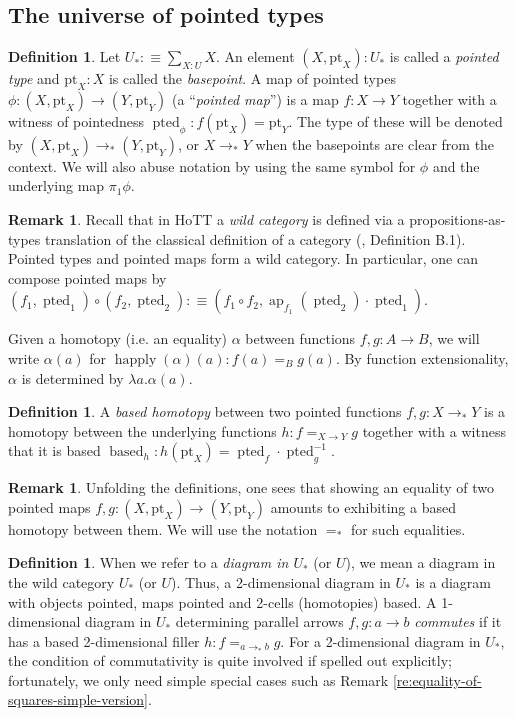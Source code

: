 \documentclass{amsart}
\theoremstyle{definition}
\newtheorem{de}[theorem]{Definition}
\newtheorem{re}[theorem]{Remark}
\newcommand{\ap}{\operatorname{ap}}
\newcommand{\tot}[2]{\sum\limits_{#1}^{}{#2}}
\newcommand{\bs}[1]{\mathrm{pt}_{#1}}
\newcommand{\ptd}[1]{\operatorname{pted}_{#1}}
\newcommand{\pto}{\to_*}
\newcommand{\bsd}[1]{\operatorname{based}_{#1}}
\begin{document}
\subsection{The universe of pointed types}
\begin{de}
    Let $U_* :\equiv \tot{X:U}{X}$. An element $(X, \bs{X}) : U_*$ is called a \textit{pointed type} and $\bs{X} : X$ is called the \textit{basepoint}. A map of pointed types $\phi: (X, \bs{X}) \to (Y, \bs{Y})$  (a ``\textit{pointed map}'') is a map $f: X \to Y$ together with a witness of pointedness $\ptd{\phi}: f(\bs{X}) = \bs{Y}$. The type of these will be denoted by $(X, \bs{X}) \pto (Y, \bs{Y})$, or $X \pto Y$ when the basepoints are clear from the context.
    We will also abuse notation by using the same symbol for $\phi$ and the underlying map $\pi_1 \phi$.
\end{de}

\begin{re}
    Recall that in HoTT a \textit{wild category} is defined via a propositions-as-types translation of the classical definition of a category (\cite{SphereSyms}, Definition B.1). Pointed types and pointed maps form a wild category. In particular, one can compose pointed maps by $(f_1, \ptd{1}) \circ (f_2, \ptd{2}) : \equiv (f_1 \circ f_2, \ap_{f_1}(\ptd{2}) \cdot \ptd{1})$.
\end{re}

Given a homotopy (i.e. an equality) $\alpha$ between functions $f,g: A \to B$, we will write $\alpha(a)$ for $\operatorname{happly}(\alpha)(a): f(a) =_B g(a)$. By function extensionality, $\alpha$ is determined by $\lambda {a}.{\alpha(a)}$.
\begin{de}
    A \textit{based homotopy} between two pointed functions $f,g: X \pto Y$ is a homotopy between the underlying functions $h : f =_{X \to Y} g$ together with a witness that it is based $\bsd{h}: h(\bs{X}) = \ptd{f} \cdot \ptd{g}^{-1} $.
\end{de}

\begin{re}
    Unfolding the definitions, one sees that showing an equality of two pointed maps $f,g : (X, \bs{X}) \to (Y, \bs{Y})$ amounts to exhibiting a based homotopy between them. We will use the notation $=_*$ for such equalities.
\end{re}

\begin{de}
    When we refer to a \textit{diagram in $U_*$} (or $U$), we mean a diagram in the wild category $U_*$ (or $U$). Thus, a 2-dimensional diagram in $U_*$ is a diagram with objects pointed, maps pointed and 2-cells (homotopies) based. A 1-dimensional diagram in $U_*$ determining parallel arrows $f,g: a\to b$ \textit{commutes} if it has a based 2-dimensional filler $h: f =_{a\pto b} g$. For a 2-dimensional diagram in $U_*$, the condition of commutativity is quite involved if spelled out explicitly; fortunately, we only need simple special cases such as Remark \ref{re:equality-of-squares-simple-version}.
\end{de}
\end{document}
